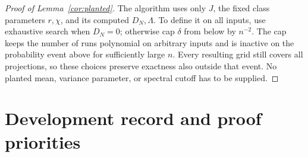 \documentclass[11pt,a4paper]{article}
\theoremstyle{definition}
\theoremstyle{remark}
\begin{document}
\begin{proof}[Proof of Lemma~\ref{cor:planted}]
The algorithm uses only $J$, the fixed class parameters $r,\chi$, and
its computed $D_N,\Lambda$. To define it on all inputs, use exhaustive
search when $D_N=0$; otherwise cap $\delta$ from below by $n^{-2}$.
The cap keeps the number of runs polynomial on arbitrary inputs and is
inactive on the probability event above for sufficiently large $n$.
Every resulting grid still covers all projections, so these choices
preserve exactness also outside that event. No planted mean, variance
parameter, or spectral cutoff has to be supplied.
\end{proof}

\section{Development record and proof priorities}\label{app:record}
\end{document}
